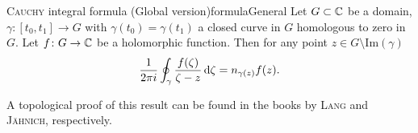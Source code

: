 \documentclass[a4paper,english]{article}
\begin{document}
\begin{thm}{\textsc{Cauchy} integral formula (Global version)}{formulaGeneral}
    Let $G \subset \operatorname{\mathbb{C}}$ be a domain, $\gamma \colon [t_0, t_1] \to G$ with $\gamma(t_0) = \gamma(t_1)$ a closed curve in $G$ homologous to zero in $G$.
    Let $f \colon G \to \operatorname{\mathbb{C}}$ be a holomorphic function.
    Then for any point $z \in G \setminus \text{Im}(\gamma)$
    \begin{equation*}
        \frac{1}{2 \pi i} \oint_{\gamma} \frac{f(\zeta)}{\zeta - z} \mathop{}\!\mathrm{d}{\zeta}
        = n_{\gamma(z)} f(z).
    \end{equation*}
\end{thm}

A topological proof of this result can be found in the books by \textsc{Lang} and \textsc{Jähnich}, respectively.
\end{document}
